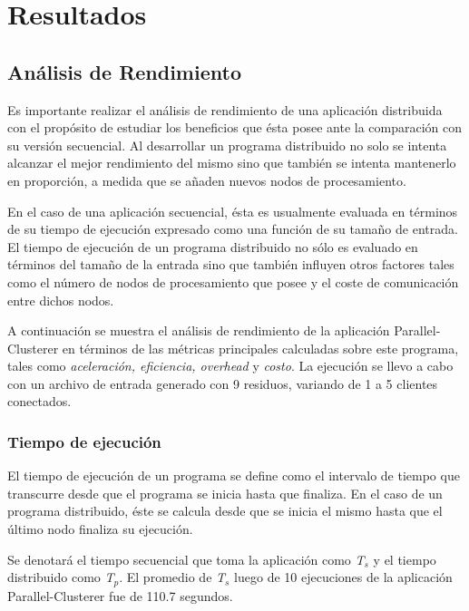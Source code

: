 \chapter{Resultados}
\label{chapter:resultados}

\section{Análisis de Rendimiento}

Es importante realizar el análisis de rendimiento de una aplicación distribuida con el propósito de estudiar los beneficios que ésta posee ante la comparación con su versión secuencial. 
Al desarrollar un programa distribuido no solo se intenta alcanzar el mejor rendimiento del mismo sino que también se intenta mantenerlo en proporción, a medida que se añaden nuevos nodos de procesamiento.

En el caso de una aplicación secuencial, ésta es usualmente evaluada en términos de su tiempo de ejecución expresado como una función de su tamaño de entrada. El tiempo de ejecución de un programa distribuido no sólo es evaluado en términos del tamaño de la entrada sino que también influyen otros factores tales como el número de nodos de procesamiento que posee y el coste de comunicación entre dichos nodos.

A continuación se muestra el análisis de rendimiento de la aplicación Parallel-Clusterer en términos de las métricas principales calculadas sobre este programa, tales como  \textit{aceleración, eficiencia, overhead} y \textit{costo}. La ejecución se llevo a cabo con un archivo de entrada generado con 9 residuos, variando de 1 a 5 clientes conectados.\\

\subsection{Tiempo de ejecución}

El tiempo de ejecución de un programa se define como el intervalo de tiempo que transcurre desde que el programa se inicia hasta que finaliza. En el caso de un programa distribuido, éste se calcula desde que se inicia el mismo hasta que el último nodo finaliza su ejecución.

Se denotará el tiempo secuencial que toma la aplicación como \textit{T$_{s}$} y el tiempo distribuido como \textit{T$_{p}$}. El promedio de \textit{T$_{s}$} luego de 10 ejecuciones de la aplicación Parallel-Clusterer fue de 110.7 segundos.

